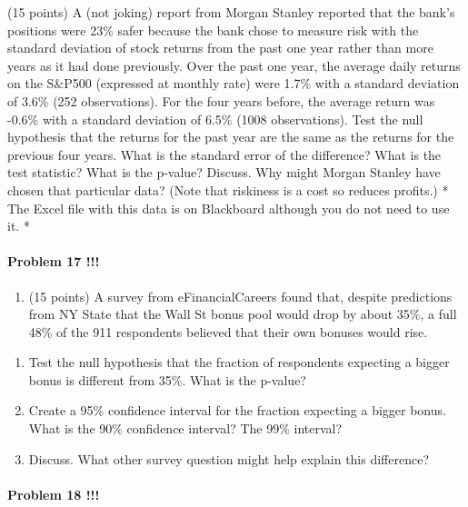 \documentclass[]{article}
\providecommand{\tightlist}{%
  \setlength{\itemsep}{0pt}\setlength{\parskip}{0pt}}
\let\oldparagraph\paragraph
\renewcommand{\paragraph}[1]{\oldparagraph{#1}\mbox{}}
\begin{document}
(15 points) A (not joking) report from Morgan Stanley reported that the
bank's positions were 23\% safer because the bank chose to measure risk
with the standard deviation of stock returns from the past one year
rather than more years as it had done previously. Over the past one
year, the average daily returns on the S\&P500 (expressed at monthly
rate) were 1.7\% with a standard deviation of 3.6\% (252 observations).
For the four years before, the average return was -0.6\% with a standard
deviation of 6.5\% (1008 observations). Test the null hypothesis that
the returns for the past year are the same as the returns for the
previous four years. What is the standard error of the difference? What
is the test statistic? What is the p-value? Discuss. Why might Morgan
Stanley have chosen that particular data? (Note that riskiness is a cost
so reduces profits.) * The Excel file with this data is on Blackboard
although you do not need to use it. *

\paragraph{Problem 17 !!!}\label{problem-17}

\begin{enumerate}
\def\labelenumi{\arabic{enumi}.}
\setcounter{enumi}{18}
\tightlist
\item
  (15 points) A survey from eFinancialCareers found that, despite
  predictions from NY State that the Wall St bonus pool would drop by
  about 35\%, a full 48\% of the 911 respondents believed that their own
  bonuses would rise.
\end{enumerate}

\begin{enumerate}
\def\labelenumi{\alph{enumi}.}
\tightlist
\item
  Test the null hypothesis that the fraction of respondents expecting a
  bigger bonus is different from 35\%. What is the p-value?
\item
  Create a 95\% confidence interval for the fraction expecting a bigger
  bonus. What is the 90\% confidence interval? The 99\% interval?
\item
  Discuss. What other survey question might help explain this
  difference?
\end{enumerate}

\paragraph{Problem 18 !!!}\label{problem-18}
\end{document}
